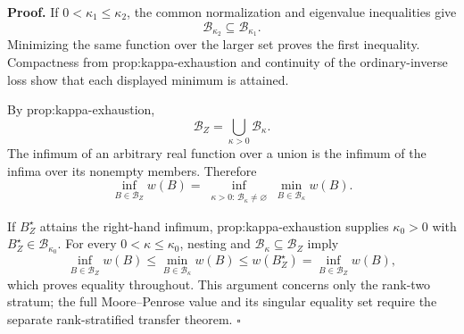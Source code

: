 \textbf{Proof.}
If \(0<\kappa_1\le\kappa_2\), the common normalization and eigenvalue inequalities give
\[
 \mathcal B_{\kappa_2}\subseteq\mathcal B_{\kappa_1}.
\]
Minimizing the same function over the larger set proves the first inequality.  Compactness from prop:kappa-exhaustion and continuity of the ordinary-inverse loss show that each displayed minimum is attained.

By prop:kappa-exhaustion,
\[
 \mathcal B_Z=\bigcup_{\kappa>0}\mathcal B_\kappa.
\]
The infimum of an arbitrary real function over a union is the infimum of the infima over its nonempty members.  Therefore
\[
 \inf_{B\in\mathcal B_Z}w(B)
 =\inf_{\substack{\kappa>0:\,\mathcal B_\kappa\ne\varnothing}}
 \min_{B\in\mathcal B_\kappa}w(B).
\]

If \(B_Z^\star\) attains the right-hand infimum, prop:kappa-exhaustion supplies \(\kappa_0>0\) with \(B_Z^\star\in\mathcal B_{\kappa_0}\).  For every \(0<\kappa\le\kappa_0\), nesting and \(\mathcal B_\kappa\subseteq\mathcal B_Z\) imply
\[
 \inf_{B\in\mathcal B_Z}w(B)
 \le\min_{B\in\mathcal B_\kappa}w(B)
 \le w(B_Z^\star)
 =\inf_{B\in\mathcal B_Z}w(B),
\]
which proves equality throughout.  This argument concerns only the rank-two stratum; the full Moore--Penrose value and its singular equality set require the separate rank-stratified transfer theorem. \(\square\)